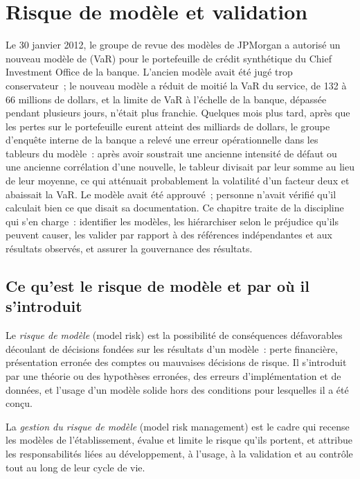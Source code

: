 \chapter{Risque de modèle et validation}\label{ch:rc:model-risk-and-validation}

Le 30 janvier 2012, le groupe de revue des modèles de JPMorgan a autorisé un nouveau modèle de  (VaR) pour le
portefeuille de crédit synthétique du Chief Investment Office de la banque. L'ancien modèle avait été jugé
trop conservateur~; le nouveau modèle a réduit de moitié la VaR du service, de 132 à 66 millions de dollars, et la
limite de VaR à l'échelle de la banque, dépassée pendant plusieurs jours, n'était plus franchie. Quelques mois plus tard, après que les pertes sur le portefeuille eurent atteint des milliards de dollars, le
groupe d'enquête interne de la banque a relevé une erreur opérationnelle dans les tableurs du modèle~: après avoir soustrait
une ancienne intensité de défaut ou une ancienne corrélation d'une nouvelle, le tableur divisait par leur somme au lieu de
leur moyenne, ce qui atténuait probablement la volatilité d'un facteur deux et abaissait la VaR. Le modèle avait
été approuvé~; personne n'avait vérifié qu'il calculait bien ce que disait sa documentation. Ce chapitre traite
de la discipline qui s'en charge~: identifier les modèles, les hiérarchiser selon le préjudice qu'ils peuvent
causer, les valider par rapport à des références indépendantes et aux résultats observés, et assurer la gouvernance des résultats.

\section{Ce qu'est le risque de modèle et par où il s'introduit}

\begin{definition}\label{def:rc:model-risk-and-validation:risk}
Le \emph{risque de modèle} (model risk) est la possibilité de conséquences défavorables découlant de décisions
fondées sur les résultats d'un modèle~: perte financière, présentation erronée des comptes ou mauvaises décisions de risque. Il s'introduit par
une théorie ou des hypothèses erronées, des erreurs d'implémentation et de données, et l'usage d'un modèle solide hors
des conditions pour lesquelles il a été conçu.
\end{definition}

\begin{definition}\label{def:rc:model-risk-and-validation:mrm}
La \emph{gestion du risque de modèle} (model risk management) est le cadre qui recense les modèles
de l'établissement, évalue et limite le risque qu'ils portent, et attribue les responsabilités liées au développement, à l'usage,
à la validation et au contrôle tout au long de leur cycle de vie.
\end{definition}

